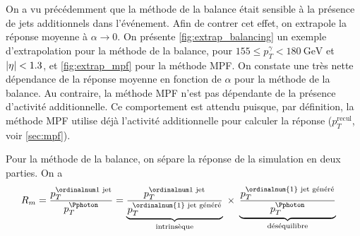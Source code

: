 
On a vu précédemment que la méthode de la balance était sensible à la présence de jets additionnels dans l'événement. Afin de contrer cet effet, on extrapole la réponse moyenne à $\alpha \rightarrow 0$. On présente \cref{fig:extrap_balancing} un exemple d'extrapolation pour la méthode de la balance, pour $155 \leq p_T^\gamma < \SI{180}{\GeV}$ et $\lvert \eta \rvert < \num{1.3}$, et \cref{fig:extrap_mpf} pour la méthode MPF. On constate une très nette dépendance de la réponse moyenne en fonction de $\alpha$ pour la méthode de la balance. Au contraire, la méthode MPF n'est pas dépendante de la présence d'activité additionnelle. Ce comportement est attendu puisque, par définition, la méthode MPF utilise déjà l'activité additionnelle pour calculer la réponse ($p_T^\text{recul}$, voir \cref{sec:mpf}).

Pour la méthode de la balance, on sépare la réponse de la simulation en deux parties. On a
\begin{align*}
  R_m &= \frac{\ptfjet}{\ptg} = \underbrace{ \frac{\ptfjet}{p_T^{\text{\ordinalnum{1} jet généré}}} }_{\text{intrinsèque}} \; \times \; \underbrace{ \frac{p_T^{\text{\ordinalnum{1} jet généré}}}{\ptg} }_{\text{déséquilibre}}
\end{align*}

